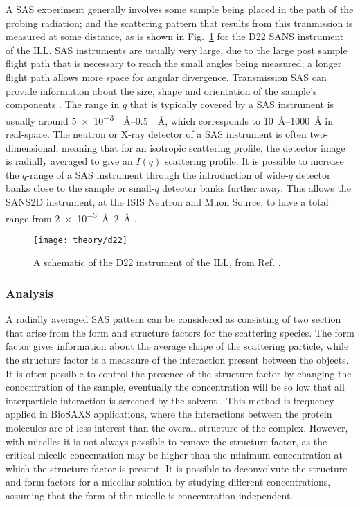 A SAS experiment generally involves some sample being placed in the path of the probing radiation; and the scattering pattern that results from this tranmission is measured at some distance, as is shown in Fig.~\ref{fig:sasgeo} for the D22 SANS instrument of the ILL.
SAS instruments are usually very large, due to the large post sample flight path that is necessary to reach the small angles being measured; a longer flight path allows more space for angular divergence.
Transmission SAS can provide information about the size, shape and orientation of the sample's components \cite{Willis2009}.
The range in $q$ that is typically covered by a SAS instrument is usually around \SIrange{5e-3}{0.5}{\per\angstrom}, which corresponds to \SIrange{10}{1000}{\angstrom} in real-space. The neutron or X-ray detector of a SAS instrument is often two-dimensional, meaning that for an isotropic scattering profile, the detector image is radially averaged to give an $I(q)$ scattering profile.
It is possible to increase the $q$-range of a SAS instrument through the introduction of wide-$q$ detector banks close to the sample or small-$q$ detector banks further away.
This allows the SANS2D instrument, at the ISIS Neutron and Muon Source, to have a total range from \SIrange{2e-3}{2}{\angstrom} \cite{sans2d2016}.
%
\begin{figure}
	\centering
	\texttt{[image: theory/d22]}
	\caption{A schematic of the D22 instrument of the ILL, from Ref. \cite{Grillo2008}.}
	\label{fig:sasgeo}
\end{figure}
%

\subsubsection{Analysis}

A radially averaged SAS pattern can be considered as consisting of two section that arise from the form and structure factors for the scattering species.
The form factor gives information about the average shape of the scattering particle, while the structure factor is a measaure of the interaction present between the objects.
It is often possible to control the presence of the structure factor by changing the concentration of the sample, eventually the concentration will be so low that all interparticle interaction is screened by the solvent \cite{Edler2015}.
This method is frequency applied in BioSAXS applications, where the interactions between the protein molecules are of less interest than the overall structure of the complex.
However, with micelles it is not always possible to remove the structure factor, as the critical micelle concentation may be higher than the minimum concentration at which the structure factor is present.
It is possible to deconvolvute the structure and form factors for a micellar solution by studying different concentrations, assuming that the form of the micelle is concentration independent.

